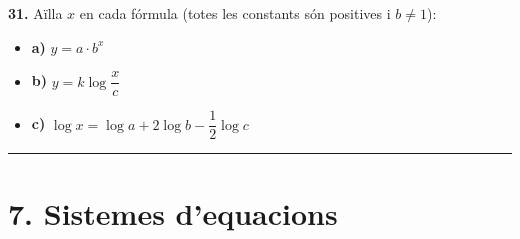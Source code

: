 \documentclass[13pt,a4paper]{extarticle}
\begin{document}
\par\noindent\begin{minipage}{\linewidth}
\textbf{31.} Aïlla $x$ en cada fórmula (totes les constants són positives i $b\neq1$):\par

\begin{itemize}[leftmargin=0pt,itemsep=6pt,topsep=4pt,parsep=0pt,label={}]
\item \textbf{a)} $y=a\cdot b^{x}$
\item \textbf{b)} $y=k\log\dfrac{x}{c}$
\item \textbf{c)} $\log x=\log a+2\log b-\dfrac12\log c$
\end{itemize}
\end{minipage}\par\vspace{1.6mm}

\vspace{1mm}\hrule\vspace{3mm}

\section*{7. Sistemes d'equacions}
\end{document}
